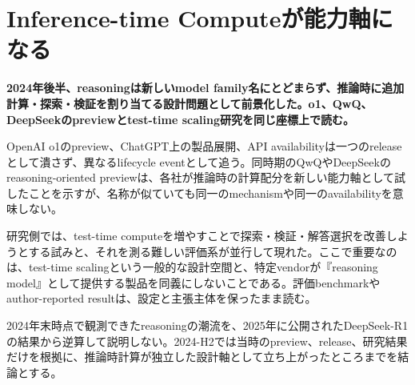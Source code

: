 \section{Inference-time Computeが能力軸になる}
\noindent\textbf{2024年後半、reasoningは新しいmodel family名にとどまらず、推論時に追加計算・探索・検証を割り当てる設計問題として前景化した。o1、QwQ、DeepSeekのpreviewとtest-time scaling研究を同じ座標上で読む。}\autocite{src-14a855188533,src-a452b2dc7f5d}

OpenAI o1のpreview、ChatGPT上の製品展開、API availabilityは一つのreleaseとして潰さず、異なるlifecycle eventとして追う。同時期のQwQやDeepSeekのreasoning-oriented previewは、各社が推論時の計算配分を新しい能力軸として試したことを示すが、名称が似ていても同一のmechanismや同一のavailabilityを意味しない。\autocite{src-14a855188533,src-a452b2dc7f5d,src-ea823ed75f72}


研究側では、test-time computeを増やすことで探索・検証・解答選択を改善しようとする試みと、それを測る難しい評価系が並行して現れた。ここで重要なのは、test-time scalingという一般的な設計空間と、特定vendorが『reasoning model』として提供する製品を同義にしないことである。評価benchmarkやauthor-reported resultは、設定と主張主体を保ったまま読む。\autocite{src-1f00c386f820,src-259b57a1bad9,src-7c2651c80f45,src-9cf289b414fd}


\begin{claimboundary}
2024年末時点で観測できたreasoningの潮流を、2025年に公開されたDeepSeek-R1の結果から逆算して説明しない。2024-H2では当時のpreview、release、研究結果だけを根拠に、推論時計算が独立した設計軸として立ち上がったところまでを結論とする。\autocite{src-ea823ed75f72}
\end{claimboundary}
